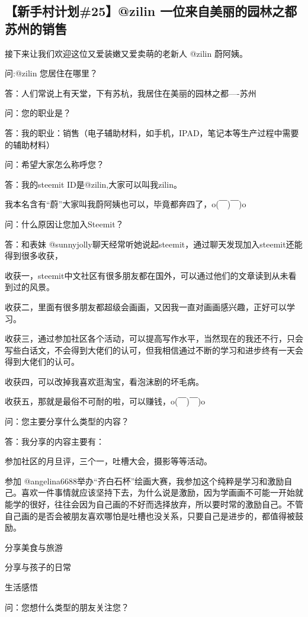 \documentclass[]{ctexbook}
\begin{document}
\hypertarget{25zilin-}{%
\subsection{【新手村计划\#25】@zilin 一位来自美丽的园林之都苏州的销售}\label{25zilin-}}

接下来让我们欢迎这位又爱装嫩又爱卖萌的老新人 @zilin 蔚阿姨。

问:@zilin 您居住在哪里？

答：人们常说上有天堂，下有苏杭，我居住在美丽的园林之都----苏州

问：您的职业是？

答：我的职业：销售（电子辅助材料，如手机，IPAD，笔记本等生产过程中需要的辅助材料）

问：希望大家怎么称呼您？

答：我的steemit ID是@zilin,大家可以叫我zilin。

我本名含有``蔚''大家叫我蔚阿姨也可以，毕竟都奔四了，o(￣)￣)o

问：什么原因让您加入Steemit？

答：和表妹 @sunnyjolly聊天经常听她说起steemit，通过聊天发现加入steemit还能得到很多收获，

收获一，steemit中文社区有很多朋友都在国外，可以通过他们的文章读到从未看到过的风景。

收获二，里面有很多朋友都超级会画画，又因我一直对画画感兴趣，正好可以学习。

收获三，通过参加社区各个活动，可以提高写作水平，当然现在的我还不行，只会写些白话文，不会得到大佬们的认可，但我相信通过不断的学习和进步终有一天会得到大佬们的认可。

收获四，可以改掉我喜欢逛淘宝，看泡沫剧的坏毛病。

收获五，那就是最俗不可耐的啦，可以赚钱，o(￣)￣)o

问：您主要分享什么类型的内容？

答：我分享的内容主要有：

参加社区的月旦评，三个一，吐槽大会，摄影等等活动。

参加 @angelina6688举办``齐白石杯''绘画大赛，我参加这个纯粹是学习和激励自己。喜欢一件事情就应该坚持下去，为什么说是激励，因为学画画不可能一开始就能学的很好，往往会因为自己画的不好而选择放弃，所以要时常的激励自己。不管自己画的是否会被朋友喜欢哪怕是吐槽也没关系，只要自己是进步的，都值得被鼓励。

分享美食与旅游

分享与孩子的日常

生活感悟

问：您想什么类型的朋友关注您？
\end{document}
